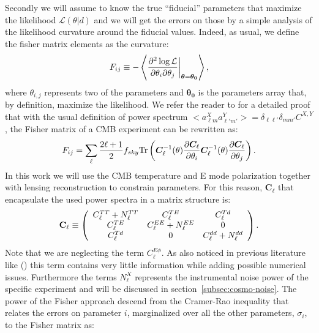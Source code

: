 \documentclass[aps,prd,preprint,groupedaddress]{revtex4-1}
\newcommand{\refssec}[1]{section~\ref{subsec:#1}}
\begin{document}
 
Secondly we will assume to know the true ``fiducial'' parameters that maximize the likelihood $\mathcal{L}(\theta|d)$ and we will get the errors on those by a simple analysis of the likelihood curvature around the fiducial values.
Indeed, as usual, we define the fisher matrix elements as the curvature:
\begin{equation}
	\centering
		F_{ij} \equiv - \left\langle\frac{\partial^2 \log \mathcal{L}}{\partial \theta_i \partial \theta_j} \bigg|_{\boldsymbol{\theta} = \boldsymbol{\theta_0}}\right\rangle,
	\label{eqn:Fij_def}
\end{equation}
where $\theta_{i,j}$ represents two of the parameters and $\boldsymbol{\theta_0}$ is the parameters array that, by definition, maximize the likelihood.
We refer the reader to \cite{} for a detailed proof that with the usual definition of power spectrum $<a_{\ell m}^{X}a_{\ell' m'}^{Y}>=\delta_{\ell \ell'}\delta_{mm'}C^{X,Y}$, the Fisher matrix of a CMB experiment can be rewritten as:
\begin{equation}
 F_{ij} = \sum_\ell \frac{2\ell+1}{2} f_{sky} {\rm Tr} \left(  \boldsymbol{C}^{-1}_\ell( \theta) \frac{\partial \boldsymbol{C}_\ell}{\partial \theta_i} \boldsymbol{C}^{-1}_\ell( \theta) \frac{\partial \boldsymbol{C}_\ell}{\partial \theta_j}  \right).
 \label{eqn:Fij_def2}
 \end{equation}
 In this work we will use the CMB temperature and E mode polarization together with lensing reconstruction to constrain parameters. For this reason, $\boldsymbol{C}_\ell$ that encapsulate the used power spectra in a matrix structure is:
 \begin{eqnarray}
 	\centering
		\mathbf{C}_\ell \equiv \left( \begin{array}{ccc}C_\ell^{TT} + N_\ell^{TT} & C_\ell^{TE} & C_\ell^{Td} \\ C_\ell^{TE} & C_\ell^{EE} + N_\ell^{EE} & 0 \\ C_\ell^{Td} & 0 & C_\ell^{dd} + N_\ell^{dd}\end{array}\right).
	\label{eqn:cov_definition}
\end{eqnarray}
Note that we are neglecting the term $C_\ell^{E\phi}$. As also noticed in previous literature like (\cite{wu:2014,2013PhRvD..87h3008H}) this term contains very little information while adding possible numerical issues.
Furthermore the terms $N_\ell^{X}$ represents the instrumental noise power of the specific experiment and will be discussed in \refssec{cosmo-noise}.
The power of the Fisher approach descend from the Cramer-Rao inequality that relates the errors on parameter $i$, marginalized over all the other parameters, $\sigma_i$, to the Fisher matrix as:
\end{document}
